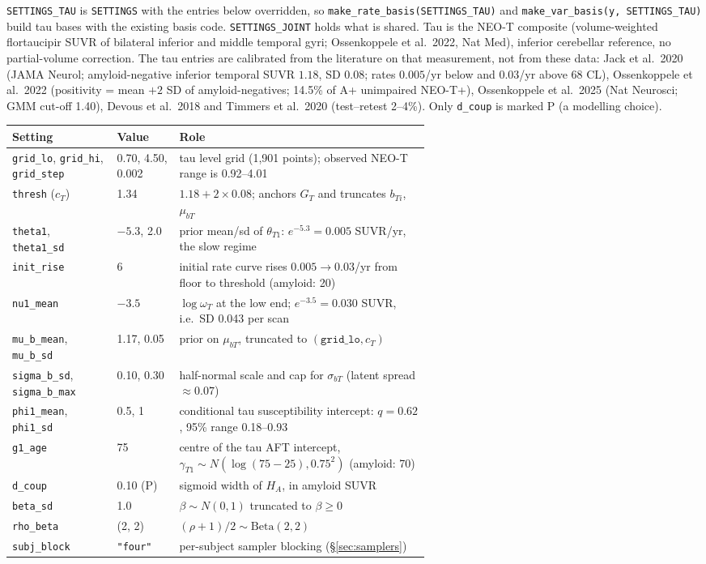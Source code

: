 \documentclass[11pt]{article}
\newcommand{\code}[1]{\texttt{#1}}
\begin{document}
\code{SETTINGS\_TAU} is \code{SETTINGS} with the entries below overridden, so
\code{make\_rate\_basis(SETTINGS\_TAU)} and \code{make\_var\_basis(y, SETTINGS\_TAU)}
build tau bases with the existing basis code. \code{SETTINGS\_JOINT} holds what is
shared. Tau is the NEO-T composite (volume-weighted flortaucipir SUVR of
bilateral inferior and middle temporal gyri; Ossenkoppele et al.\ 2022, Nat Med),
inferior cerebellar reference, no partial-volume correction. The tau entries are
calibrated from the literature on that measurement, not from these data: Jack et
al.\ 2020 (JAMA Neurol; amyloid-negative inferior temporal SUVR $1.18$, SD $0.08$;
rates $0.005$/yr below and $0.03$/yr above 68 CL), Ossenkoppele et al.\ 2022
(positivity = mean $+2$ SD of amyloid-negatives; 14.5\% of A+ unimpaired NEO-T+),
Ossenkoppele et al.\ 2025 (Nat Neurosci; GMM cut-off 1.40), Devous et al.\ 2018
and Timmers et al.\ 2020 (test--retest 2--4\%). Only \code{d\_coup} is marked P
(a modelling choice).

\begin{center}
\begin{tabular}{@{}llp{0.6\linewidth}@{}}
\toprule
Setting & Value & Role \\
\midrule
\code{grid\_lo}, \code{grid\_hi}, \code{grid\_step} & 0.70, 4.50, 0.002 & tau level grid (1{,}901 points); observed NEO-T range is 0.92--4.01 \\
\code{thresh} ($c_T$) & 1.34 & $1.18+2\times0.08$; anchors $G_T$ and truncates $b_{Ti}$, $\mu_{bT}$ \\
\code{theta1}, \code{theta1\_sd} & $-5.3$, 2.0 & prior mean/sd of $\theta_{T1}$: $e^{-5.3}=0.005$ SUVR/yr, the slow regime \\
\code{init\_rise} & 6 & initial rate curve rises $0.005\to0.03$/yr from floor to threshold (amyloid: 20) \\
\code{nu1\_mean} & $-3.5$ & $\log\omega_T$ at the low end; $e^{-3.5}=0.030$ SUVR, i.e.\ SD 0.043 per scan \\
\code{mu\_b\_mean}, \code{mu\_b\_sd} & 1.17, 0.05 & prior on $\mu_{bT}$, truncated to $(\code{grid\_lo}, c_T)$ \\
\code{sigma\_b\_sd}, \code{sigma\_b\_max} & 0.10, 0.30 & half-normal scale and cap for $\sigma_{bT}$ (latent spread $\approx0.07$) \\
\code{phi1\_mean}, \code{phi1\_sd} & 0.5, 1 & conditional tau susceptibility intercept: $q=0.62$, 95\% range 0.18--0.93 \\
\code{g1\_age} & 75 & centre of the tau AFT intercept, $\gamma_{T1}\sim N(\log(75-25),0.75^2)$ (amyloid: 70) \\
\midrule
\code{d\_coup} & 0.10 (P) & sigmoid width of $H_A$, in amyloid SUVR \\
\code{beta\_sd} & 1.0 & $\beta\sim N(0,1)$ truncated to $\beta\ge 0$ \\
\code{rho\_beta} & (2, 2) & $(\rho+1)/2\sim\mathrm{Beta}(2,2)$ \\
\code{subj\_block} & \code{"four"} & per-subject sampler blocking (\S\ref{sec:samplers}) \\
\bottomrule
\end{tabular}
\end{center}
\end{document}
